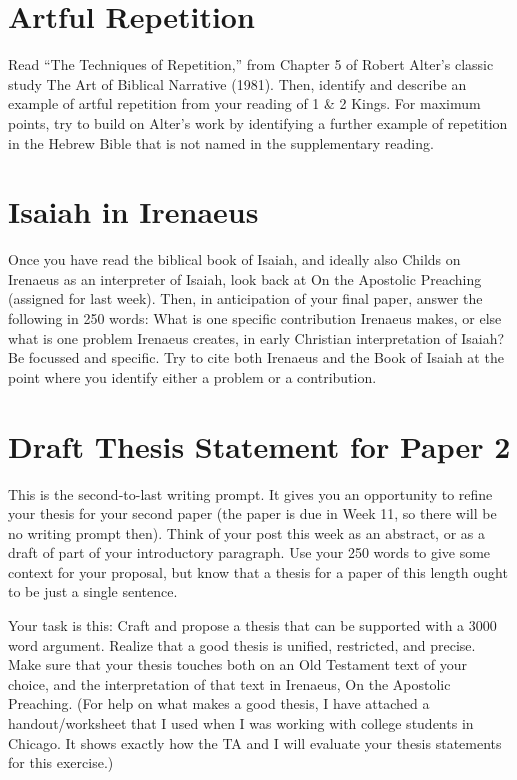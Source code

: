 \documentclass[12pt]{article}
\begin{document}
\section{Artful Repetition}

Read “The Techniques of Repetition,” from Chapter 5 of Robert Alter’s classic study The Art of Biblical Narrative (1981). Then, identify and describe an example of artful repetition from your reading of 1 \& 2 Kings. For maximum points, try to build on Alter’s work by identifying a further example of repetition in the Hebrew Bible that is not named in the supplementary reading.


\section{Isaiah in Irenaeus}

Once you have read the biblical book of Isaiah, and ideally also Childs on Irenaeus as an interpreter of Isaiah, look back at On the Apostolic Preaching (assigned for last week). Then, in anticipation of your final paper, answer the following in 250 words: What is one specific contribution Irenaeus makes, or else what is one problem Irenaeus creates, in early Christian interpretation of Isaiah? Be focussed and specific. Try to cite both Irenaeus and the Book of Isaiah at the point where you identify either a problem or a contribution.


\section{Draft Thesis Statement for Paper 2}

This is the second-to-last writing prompt. It gives you an opportunity to refine your thesis for your second paper (the paper is due in Week 11, so there will be no writing prompt then). Think of your post this week as an abstract, or as a draft of part of your introductory paragraph. Use your 250 words to give some context for your proposal, but know that a thesis for a paper of this length ought to be just a single sentence.

Your task is this: Craft and propose a thesis that can be supported with a 3000 word argument. Realize that a good thesis is unified, restricted, and precise. Make sure that your thesis touches both on an Old Testament text of your choice, and the interpretation of that text in Irenaeus, On the Apostolic Preaching. (For help on what makes a good thesis, I have attached a handout/worksheet that I used when I was working with college students in Chicago. It shows exactly how the TA and I will evaluate your thesis statements for this exercise.)
\end{document}
